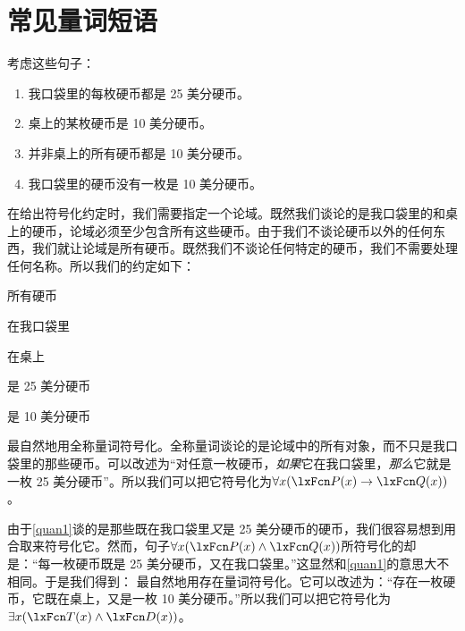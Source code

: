 
\section{常见量词短语}
考虑这些句子：

\begin{enumerate}
		\item\label{quan1} 我口袋里的每枚硬币都是 25 美分硬币。
		\item\label{quan2} 桌上的某枚硬币是 10 美分硬币。
		\item\label{quan3} 并非桌上的所有硬币都是 10 美分硬币。
		\item\label{quan4} 我口袋里的硬币没有一枚是 10 美分硬币。
	\end{enumerate}

在给出符号化约定时，我们需要指定一个论域。既然我们谈论的是我口袋里的和桌上的硬币，论域必须至少包含所有这些硬币。由于我们不谈论硬币以外的任何东西，我们就让论域是所有硬币。既然我们不谈论任何特定的硬币，我们不需要处理任何名称。所以我们的约定如下：

\begin{ekey}
		\item[\text{论域}] 所有硬币
		\item[\atom{P}{x}]  在我口袋里
		\item[\atom{T}{x}]  在桌上
		\item[\atom{Q}{x}]  是 25 美分硬币
		\item[\atom{D}{x}]  是 10 美分硬币
	\end{ekey}

最自然地用全称量词符号化。全称量词谈论的是论域中的所有对象，而不只是我口袋里的那些硬币。可以改述为“对任意一枚硬币，\emph{如果}它在我口袋里，\emph{那么}它就是一枚 25 美分硬币”。所以我们可以把它符号化为$\forall x(\atom{P}{x} \eif \atom{Q}{x})$。

由于\cref*{quan1}谈的是那些既在我口袋里\emph{又}是 25 美分硬币的硬币，我们很容易想到用合取来符号化它。然而，句子$\forall x(\atom{P}{x} \eand \atom{Q}{x})$所符号化的却是：“每一枚硬币既是 25 美分硬币，又在我口袋里。”这显然和\cref*{quan1}的意思大不相同。于是我们得到：
最自然地用存在量词符号化。它可以改述为：“存在一枚硬币，它既在桌上，又是一枚 10 美分硬币。”所以我们可以把它符号化为$\exists x(\atom{T}{x} \eand \atom{D}{x})$。

